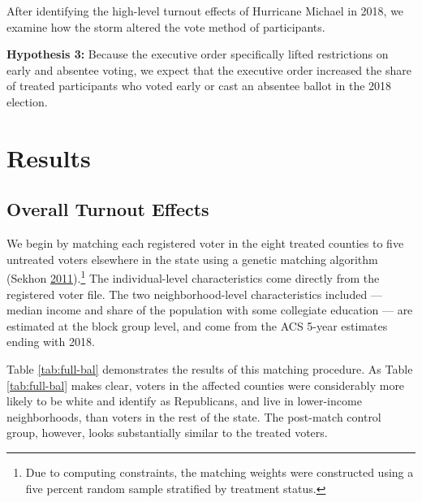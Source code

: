 \documentclass[
  12pt,
]{article}
\begin{document}
After identifying the high-level turnout effects of Hurricane Michael in 2018, we examine how the storm altered the vote method of participants.

\textbf{Hypothesis 3:} Because the executive order specifically lifted restrictions on early and absentee voting, we expect that the executive order increased the share of treated participants who voted early or cast an absentee ballot in the 2018 election.

\hypertarget{results}{%
\section*{Results}\label{results}}

\hypertarget{overall-turnout-effects}{%
\subsection*{Overall Turnout Effects}\label{overall-turnout-effects}}

We begin by matching each registered voter in the eight treated counties to five untreated voters elsewhere in the state using a genetic matching algorithm (Sekhon \protect\hyperlink{ref-Sekhon2011}{2011}).\footnote{Due to computing constraints, the matching weights were constructed using a five percent random sample stratified by treatment status.} The individual-level characteristics come directly from the registered voter file. The two neighborhood-level characteristics included --- median income and share of the population with some collegiate education --- are estimated at the block group level, and come from the ACS 5-year estimates ending with 2018.

Table \ref{tab:full-bal} demonstrates the results of this matching procedure. As Table \ref{tab:full-bal} makes clear, voters in the affected counties were considerably more likely to be white and identify as Republicans, and live in lower-income neighborhoods, than voters in the rest of the state. The post-match control group, however, looks substantially similar to the treated voters.
\end{document}
